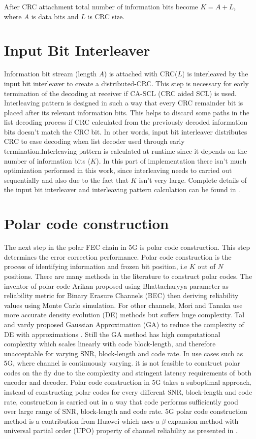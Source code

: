 After CRC attachment total number of information bits become $K = A + L$, where $ A $ is data bits and $ L $ is CRC size.

\section{Input Bit Interleaver}
Information bit stream (length $A$) is attached with CRC($L$) is interleaved by the input bit interleaver to create a distributed-CRC. This step is necessary for early termination of the decoding at receiver if CA-SCL (CRC aided SCL) is used. Interleaving pattern is designed in such a way that every CRC remainder bit is placed after its relevant information bits. This helps to discard some paths in the list decoding process if CRC calculated from the previously decoded information bits doesn't match the CRC bit. In other words, input bit interleaver distributes CRC to ease decoding when list decoder used through early termination.Interleaving pattern is calculated at runtime since it depends on the number of information bits ($K$). In this part of implementation there isn't much optimization performed in this work, since interleaving needs to carried out sequentially and also due to the fact that $K$ isn't very large. Complete details of the input bit interleaver and interleaving pattern calculation can be found in \cite{3gpp.38.212}.

\section{Polar code construction}
The next step in the polar FEC chain in 5G is polar code construction. This step determines the error correction performance. Polar code construction is the process of identifying information and frozen bit position, i.e $K$ out of $N$ positions. There are many methods in the literature to construct polar codes. The inventor of polar code Arikan \cite{Arikan} proposed using Bhattacharyya parameter as reliability metric for Binary Erasure Channels (BEC) then deriving reliability values using Monte Carlo simulation. For other channels, Mori and Tanaka \cite{MoriTanakaDE} use more accurate density evolution (DE) methods but suffers huge complexity. Tal and vardy proposed Gaussian Approximation (GA) to reduce the complexity of DE with approximations \cite{TalVardyGA}. Still the GA method has high computational complexity which scales linearly with code block-length, and therefore unacceptable for varying SNR, block-length and code rate. In use cases such as 5G, where channel is continuously varying. it is not feasible to construct polar codes on the fly due to the complexity and stringent latency requirements of both encoder and decoder. Polar code construction in 5G takes a suboptimal approach, instead of constructing polar codes for every different SNR, block-length and code rate, construction is carried out in a way that code performs sufficiently good over large range of SNR, block-length and code rate. 5G polar code construction method is a contribution from Huawei which uses a $\beta$-expansion method with universal partial order (UPO) property of channel reliability as presented in \cite{betaExpansion}. \newline

